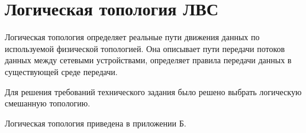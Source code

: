 \documentclass[russian,utf8,pointsection,simple,14pt]{eskdtext}
\begin{document}
	\maketitle
	\newpage
	\tableofcontents
	\newpage
	\section{Логическая топология ЛВС}
	
	Логическая топология определяет реальные пути движения данных по используемой физической топологией. Она описывает пути передачи потоков данных между сетевыми устройствами, определяет правила передачи данных в существующей среде передачи.
	
	Для решения требований технического задания было решено выбрать логическую смешанную топологию.
	
	Логическая топология приведена в приложении Б.
\end{document}
